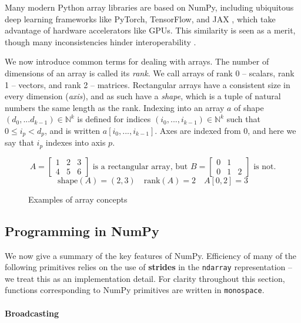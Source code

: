 Many modern Python array libraries are based on NumPy, including ubiquitous deep learning frameworks like PyTorch, TensorFlow, and JAX \cite{frostig2018compiling, paszke2019pytorch, abadi2016tensorflow}, which take advantage of hardware accelerators like GPUs. This similarity is seen as a merit, though many inconsistencies hinder interoperability \cite{meurer2023python}.

We now introduce common terms for dealing with arrays. The number of dimensions of an array is called its \textit{rank}. We call arrays of rank 0  -- scalars, rank 1 -- vectors, and rank 2 -- matrices. Rectangular arrays have a consistent size in every dimension (\textit{axis}), and as such have a \textit{shape}, which is a tuple of natural numbers the same length as the rank. Indexing into an array $a$ of shape $(d_0, ... d_{k-1}) \in \mathbb{N}^k$ is defined for indices $(i_0, ..., i_{k-1}) \in \mathbb{N}^k$ such that $0 \le i_p < d_p$, and is written $a[i_0, ..., i_{k-1}]$. Axes are indexed from 0, and here we say that $i_p$ indexes into axis $p$.
\begin{figure}[h]
    \centering
    $$ A = \begin{bmatrix}
        1 & 2 & 3 \\ 
        4 & 5 & 6
    \end{bmatrix} \text{ is a rectangular array, but } B = \begin{bmatrix}
    0 & 1 & \\
    0 & 1 & 2
    \end{bmatrix} \text{ is not.} $$
    $$ \mathrm{shape}(A) = (2, 3)  \quad \mathrm{rank}(A) = 2 \quad A[0, 2] = 3 $$
    \caption{Examples of array concepts}
    \label{fig:array-examples}
\end{figure}

\subsection{Programming in NumPy} 

We now give a summary of the key features of NumPy. Efficiency of many of the following primitives relies on the use of \textbf{strides} in the \texttt{ndarray} representation \cite{harris2020array} -- we treat this as an implementation detail. For clarity throughout this section, functions corresponding to NumPy primitives are written in \texttt{monospace}.

\vspace{-0.7em}
\paragraph{Broadcasting}

